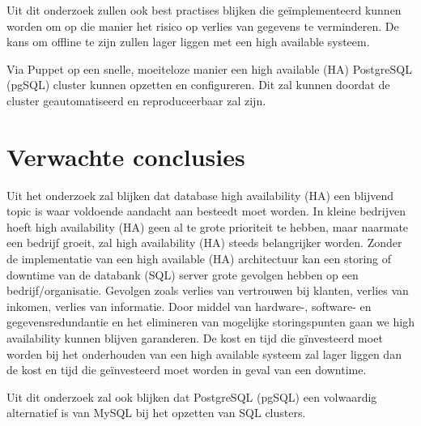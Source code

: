 Uit dit onderzoek zullen ook best practises blijken die geïmplementeerd kunnen worden om op die manier het risico op verlies van gegevens te verminderen. De kans om offline te zijn zullen lager liggen met een high available systeem.

Via Puppet op een snelle, moeiteloze manier een high available (HA) PostgreSQL (pgSQL) cluster kunnen opzetten en configureren. Dit zal kunnen doordat de cluster geautomatiseerd en reproduceerbaar zal zijn.



\section{Verwachte conclusies}
\label{sec:verwachte_conclusies}
Uit het onderzoek zal blijken dat database high availability (HA) een blijvend topic is waar voldoende aandacht aan besteedt moet worden. In kleine bedrijven hoeft high availability (HA) geen al te grote prioriteit te hebben, maar naarmate een bedrijf groeit, zal high availability (HA) steeds belangrijker worden. Zonder de implementatie van een high available (HA) architectuur kan een storing of downtime van de databank (SQL) server  grote gevolgen hebben op een bedrijf/organisatie. Gevolgen zoals verlies van vertrouwen bij klanten, verlies van inkomen, verlies van informatie. Door middel van hardware-, software- en gegevensredundantie en het elimineren van mogelijke storingspunten gaan we high availability kunnen blijven garanderen.
De kost en tijd die gïnvesteerd moet worden bij het onderhouden van een high available systeem zal lager liggen dan de kost en tijd die geïnvesteerd moet worden in geval van een downtime. 

Uit dit onderzoek zal ook blijken dat PostgreSQL (pgSQL) een volwaardig alternatief is van MySQL bij het opzetten van SQL clusters.

